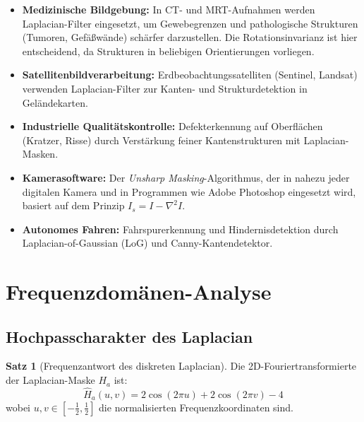 ﻿\documentclass[a4paper,12pt]{article}
\theoremstyle{definition}
\newtheorem{satz}{Satz}
\begin{document}
\begin{itemize}
    \item \textbf{Medizinische Bildgebung:} In CT- und MRT-Aufnahmen werden Laplacian-Filter
          eingesetzt, um Gewebegrenzen und pathologische Strukturen (Tumoren, Gefäßwände) schärfer
          darzustellen. Die Rotationsinvarianz ist hier entscheidend, da Strukturen in beliebigen
          Orientierungen vorliegen.
    \item \textbf{Satellitenbildverarbeitung:} Erdbeobachtungssatelliten (Sentinel, Landsat)
          verwenden Laplacian-Filter zur Kanten- und Strukturdetektion in Geländekarten.
    \item \textbf{Industrielle Qualitätskontrolle:} Defekterkennung auf Oberflächen (Kratzer,
          Risse) durch Verstärkung feiner Kantenstrukturen mit Laplacian-Masken.
    \item \textbf{Kamerasoftware:} Der \emph{Unsharp Masking}-Algorithmus, der in nahezu jeder
          digitalen Kamera und in Programmen wie Adobe Photoshop eingesetzt wird, basiert auf dem
          Prinzip $I_s = I - \nabla^2 I$.
    \item \textbf{Autonomes Fahren:} Fahrspurerkennung und Hindernisdetektion durch
          Laplacian-of-Gaussian (LoG) und Canny-Kantendetektor.
\end{itemize}

\section{Frequenzdomänen-Analyse}

\subsection{Hochpasscharakter des Laplacian}

\begin{satz}[Frequenzantwort des diskreten Laplacian]
\label{satz:freq}
    Die 2D-Fouriertransformierte der Laplacian-Maske $H_a$ ist:
    \[
        \hat{H}_a(u,v) = 2\cos(2\pi u) + 2\cos(2\pi v) - 4
    \]
    wobei $u, v \in [-\frac{1}{2}, \frac{1}{2}]$ die normalisierten Frequenzkoordinaten sind.
\end{satz}
\end{document}
